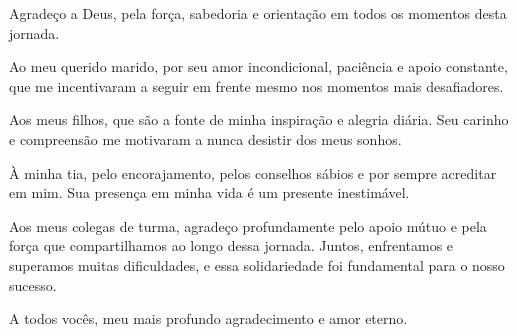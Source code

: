 
\begin{agradecimentos}
Agradeço a Deus, pela força, sabedoria e orientação em todos os momentos desta jornada.

Ao meu querido marido, por seu amor incondicional, paciência e apoio constante, que me incentivaram a seguir em frente mesmo nos momentos mais desafiadores.

Aos meus filhos, que são a fonte de minha inspiração e alegria diária. Seu carinho e compreensão me motivaram a nunca desistir dos meus sonhos.

À minha tia, pelo encorajamento, pelos conselhos sábios e por sempre acreditar em mim. Sua presença em minha vida é um presente inestimável.

Aos meus colegas de turma, agradeço profundamente pelo apoio mútuo e pela força que compartilhamos ao longo dessa jornada. Juntos, enfrentamos e superamos muitas dificuldades, e essa solidariedade foi fundamental para o nosso sucesso.

A todos vocês, meu mais profundo agradecimento e amor eterno.

\end{agradecimentos}